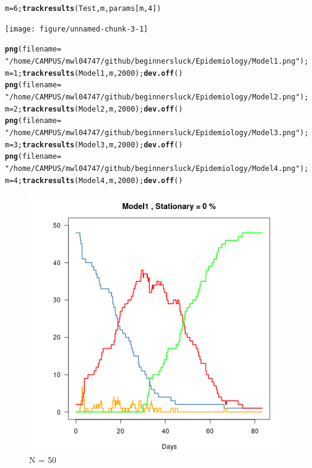\documentclass{article}\usepackage[]{graphicx}\usepackage[]{color}
\makeatletter
\newcommand{\hlnum}[1]{\textcolor[rgb]{0.686,0.059,0.569}{#1}}%
\newcommand{\hlstr}[1]{\textcolor[rgb]{0.192,0.494,0.8}{#1}}%
\newcommand{\hlstd}[1]{\textcolor[rgb]{0.345,0.345,0.345}{#1}}%
\newcommand{\hlkwb}[1]{\textcolor[rgb]{0.69,0.353,0.396}{#1}}%
\newcommand{\hlkwc}[1]{\textcolor[rgb]{0.333,0.667,0.333}{#1}}%
\newcommand{\hlkwd}[1]{\textcolor[rgb]{0.737,0.353,0.396}{\textbf{#1}}}%
\newenvironment{kframe}{%
 \def\at@end@of@kframe{}%
 \ifinner\ifhmode%
  \def\at@end@of@kframe{\end{minipage}}%
  \begin{minipage}{\columnwidth}%
 \fi\fi%
 \def\FrameCommand##1{\hskip\@totalleftmargin \hskip-\fboxsep
 \colorbox{shadecolor}{##1}\hskip-\fboxsep
     \hskip-\linewidth \hskip-\@totalleftmargin \hskip\columnwidth}%
 \MakeFramed {\advance\hsize-\width
   \@totalleftmargin\z@ \linewidth\hsize
   \@setminipage}}%
 {\par\unskip\endMakeFramed%
 \at@end@of@kframe}
\newenvironment{knitrout}{}{} %
\makeatother
\begin{document}
\begin{knitrout}
\begin{kframe}
\begin{alltt}
\hlstd{m} \hlkwb{=} \hlnum{6}\hlstd{;} \hlkwd{trackresults}\hlstd{(Test, m, params[m,}\hlnum{4}\hlstd{])}
\end{alltt}
\end{kframe}
\texttt{[image: figure/unnamed-chunk-3-1]} 
\begin{kframe}\begin{alltt}
\hlkwd{png}\hlstd{(}\hlkwc{filename} \hlstd{=}
  \hlstr{"/home/CAMPUS/mwl04747/github/beginnersluck/Epidemiology/Model1.png"}\hlstd{);}
  \hlstd{m} \hlkwb{=} \hlnum{1}\hlstd{;} \hlkwd{trackresults}\hlstd{(Model1, m,} \hlnum{2000}\hlstd{);} \hlkwd{dev.off}\hlstd{()}
\hlkwd{png}\hlstd{(}\hlkwc{filename} \hlstd{=}
  \hlstr{"/home/CAMPUS/mwl04747/github/beginnersluck/Epidemiology/Model2.png"}\hlstd{);}
  \hlstd{m} \hlkwb{=} \hlnum{2}\hlstd{;} \hlkwd{trackresults}\hlstd{(Model2, m,} \hlnum{2000}\hlstd{);} \hlkwd{dev.off}\hlstd{()}
\hlkwd{png}\hlstd{(}\hlkwc{filename} \hlstd{=}
  \hlstr{"/home/CAMPUS/mwl04747/github/beginnersluck/Epidemiology/Model3.png"}\hlstd{);}
  \hlstd{m} \hlkwb{=} \hlnum{3}\hlstd{;} \hlkwd{trackresults}\hlstd{(Model3, m,} \hlnum{2000}\hlstd{);} \hlkwd{dev.off}\hlstd{()}
\hlkwd{png}\hlstd{(}\hlkwc{filename} \hlstd{=}
  \hlstr{"/home/CAMPUS/mwl04747/github/beginnersluck/Epidemiology/Model4.png"}\hlstd{);}
  \hlstd{m} \hlkwb{=} \hlnum{4}\hlstd{;} \hlkwd{trackresults}\hlstd{(Model4, m,} \hlnum{2000}\hlstd{);} \hlkwd{dev.off}\hlstd{()}
\end{alltt}
\end{kframe}
\end{knitrout}

\begin{figure}
\includegraphics[width=1\textwidth]{Model1.png}
\caption{N = 50}
\end{figure}
\end{document}
